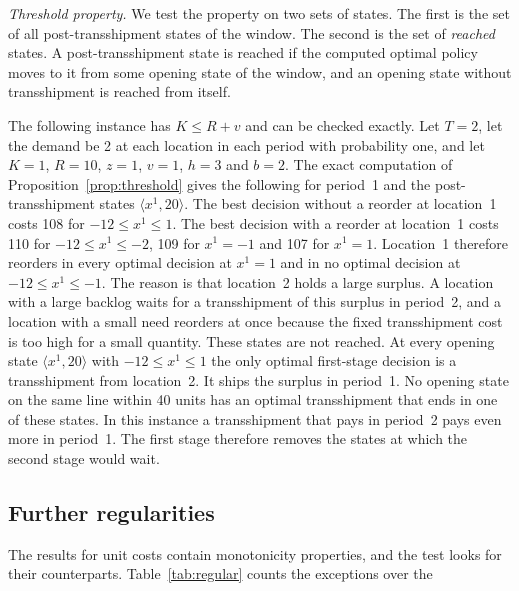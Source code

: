 \emph{Threshold property.} We test the property on two sets of states. The first is the set of all post-transshipment states of the window. The second is the set of \emph{reached} states. A post-transshipment state is reached if the computed optimal policy moves to it from some opening state of the window, and an opening state without transshipment is reached from itself.

\begin{remark}\label{obs:unreached}
The following instance has $K\le R+v$ and can be checked exactly. Let $T=2$, let the demand be 2 at each location in each period with probability one, and let $K=1$, $R=10$, $z=1$, $v=1$, $h=3$ and $b=2$. The exact computation of Proposition~\ref{prop:threshold} gives the following for period~1 and the post-transshipment states $\langle x^1,20\rangle$. The best decision without a reorder at location~1 costs 108 for $-12\le x^1\le1$. The best decision with a reorder at location~1 costs 110 for $-12\le x^1\le-2$, 109 for $x^1=-1$ and 107 for $x^1=1$. Location~1 therefore reorders in every optimal decision at $x^1=1$ and in no optimal decision at $-12\le x^1\le-1$. The reason is that location~2 holds a large surplus. A location with a large backlog waits for a transshipment of this surplus in period~2, and a location with a small need reorders at once because the fixed transshipment cost is too high for a small quantity. These states are not reached. At every opening state $\langle x^1,20\rangle$ with $-12\le x^1\le1$ the only optimal first-stage decision is a transshipment from location~2. It ships the surplus in period~1. No opening state on the same line within 40 units has an optimal transshipment that ends in one of these states. In this instance a transshipment that pays in period~2 pays even more in period~1. The first stage therefore removes the states at which the second stage would wait.
\end{remark}

\subsection{Further regularities}\label{sec:regular}

The results for unit costs contain monotonicity properties, and the test looks for their counterparts. Table~\ref{tab:regular} counts the exceptions over the %

